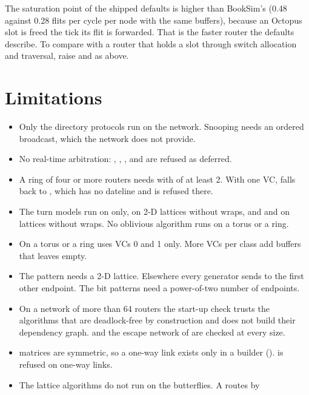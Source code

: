 The saturation point of the shipped defaults is higher than BookSim's (0.48 against 0.28 flits per
cycle per node with the same buffers), because an Octopus slot is freed the tick its flit is
forwarded. That is the faster router the defaults describe. To compare with a router that holds a
slot through switch allocation and traversal, raise  and
 as above.

\section{Limitations}\label{sec:noc-limits}

\begin{itemize}
\item Only the directory protocols run on the network. Snooping needs an ordered broadcast, which
  the network does not provide.
\item No real-time arbitration: , , ,
   and  are refused as deferred.
\item A ring of four or more routers needs  with  of at least 2.
  With one VC,  falls back to , which has no dateline and is refused there.
\item The turn models run on  only,  on 2-D lattices without wraps, and
   and  on lattices without wraps. No oblivious algorithm runs on a torus
  or a ring.
\item On a torus or a ring  uses VCs 0 and 1 only. More VCs per class add buffers that
   leaves empty.
\item The  pattern needs a 2-D lattice. Elsewhere every generator sends to the
  first other endpoint. The bit patterns need a power-of-two number of endpoints.
\item On a network of more than 64 routers the start-up check trusts the algorithms that are
  deadlock-free by construction and does not build their dependency graph.  and the
  escape network of  are checked at every size.
\item {} matrices are symmetric, so a one-way link exists only in a builder
  ().  is refused on one-way links.
\item The lattice algorithms do not run on the butterflies. A  routes by

\end{itemize}
